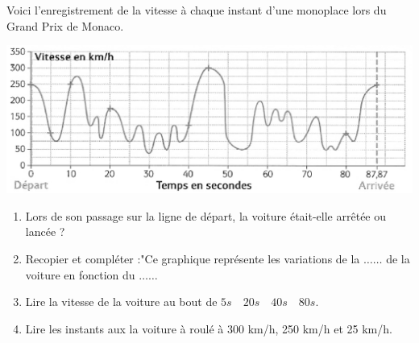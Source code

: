 
Voici l'enregistrement de la vitesse à chaque instant d'une monoplace lors du Grand Prix de Monaco.

\begin{center}
\includegraphics[scale=0.6]{NF-47.png} 
\end{center}

\begin{enumerate}
\item Lors de son passage sur la ligne de départ, la voiture était-elle arrêtée ou lancée ?
\item Recopier et compléter :"Ce graphique représente les variations de la $\dots \ldots$ de la voiture en fonction du $\ldots \ldots$
\item Lire la vitesse de la voiture au bout de $ 5s \quad 20s \quad 40s \quad 80s $.
\item Lire les instants aux la voiture à roulé à 300 km/h, 250 km/h et 25 km/h.
\end{enumerate}